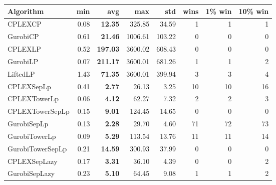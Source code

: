 \begin{tabular}{lrrrrrrr}
Algorithm & min & avg & max & std
& wins & 1\% win & 10\% win 
\\
\hline
CPLEXCP&0.08& \bf12.35& 325.85& 34.59&1&1&1\\
GurobiCP&0.61& \bf21.46& 1006.61& 103.22&0&0&0\\
CPLEXLP&0.52& \bf197.03& 3600.02& 608.43&0&0&0\\
GurobiLP&0.07& \bf211.17& 3600.01& 681.26&1&1&2\\
LiftedLP&1.43& \bf71.35& 3600.01& 399.94&3&3&4\\
CPLEXSepLp&0.41& \bf2.77& 26.13& 3.25&10&10&16\\
CPLEXTowerLp&0.06& \bf4.12& 62.27& 7.32&2&2&3\\
CPLEXTowerSepLp&0.15& \bf9.01& 124.45& 14.65&0&0&0\\
GurobiSepLp&0.13& \bf2.28& 29.70& 4.60&71&72&73\\
GurobiTowerLp&0.09& \bf5.29& 113.54& 13.76&11&11&14\\
GurobiTowerSepLp&0.21& \bf14.59& 300.93& 37.99&0&0&0\\
CPLEXSepLazy&0.17& \bf3.31& 36.10& 4.39&0&0&2\\
GurobiSepLazy&0.23& \bf5.10& 64.45& 9.08&1&1&2
\end{tabular}
